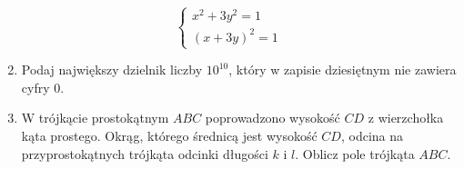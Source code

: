 \documentclass[10pt]{article}
\begin{document}
\[
\left\{\begin{array}{l}
x^{2}+3 y^{2}=1 \\
(x+3 y)^{2}=1
\end{array}\right.
\]

\begin{enumerate}
  \setcounter{enumi}{1}
  \item Podaj największy dzielnik liczby \(10^{10}\), który w zapisie dziesiętnym nie zawiera cyfry 0.
  \item W trójkącie prostokątnym \(A B C\) poprowadzono wysokość \(C D\) z wierzchołka kąta prostego. Okrąg, którego średnicą jest wysokość \(C D\), odcina na przyprostokątnych trójkąta odcinki długości \(k\) i \(l\). Oblicz pole trójkąta \(A B C\).
\end{enumerate}
\end{document}

